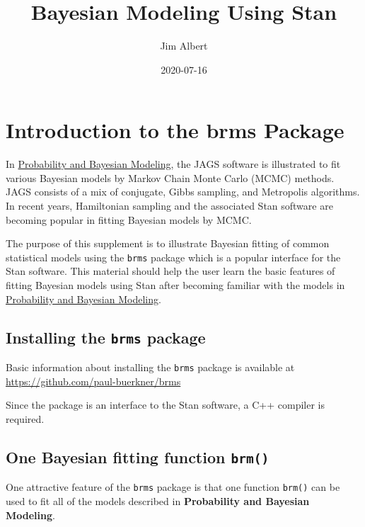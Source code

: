 \documentclass[
]{book}
\title{Bayesian Modeling Using Stan}
\author{Jim Albert}
\date{2020-07-16}
\begin{document}
\maketitle

{
\setcounter{tocdepth}{1}
\tableofcontents
}
\hypertarget{introduction-to-the-brms-package}{%
\chapter{Introduction to the brms Package}\label{introduction-to-the-brms-package}}

In \href{https://bayesball.github.io/BOOK}{Probability and Bayesian Modeling}, the JAGS software is illustrated to fit various Bayesian models by Markov Chain Monte Carlo (MCMC) methods. JAGS consists of a mix of conjugate, Gibbs sampling, and Metropolis algorithms. In recent years, Hamiltonian sampling and the associated Stan software are becoming popular in fitting Bayesian models by MCMC.

The purpose of this supplement is to illustrate Bayesian fitting of common statistical models using the \texttt{brms} package which is a popular interface for the Stan software. This material should help the user learn the basic features of fitting Bayesian models using Stan after becoming familiar with the models in \href{https://bayesball.github.io/BOOK}{Probability and Bayesian Modeling}.

\hypertarget{installing-the-brms-package}{%
\section{\texorpdfstring{Installing the \texttt{brms} package}{Installing the brms package}}\label{installing-the-brms-package}}

Basic information about installing the \texttt{brms} package is available at \url{https://github.com/paul-buerkner/brms}

Since the package is an interface to the Stan software, a C++ compiler is required.

\hypertarget{one-bayesian-fitting-function-brm}{%
\section{\texorpdfstring{One Bayesian fitting function \texttt{brm()}}{One Bayesian fitting function brm()}}\label{one-bayesian-fitting-function-brm}}

One attractive feature of the \texttt{brms} package is that one function \texttt{brm()} can be used to fit all of the models described in \textbf{Probability and Bayesian Modeling}.
\end{document}
